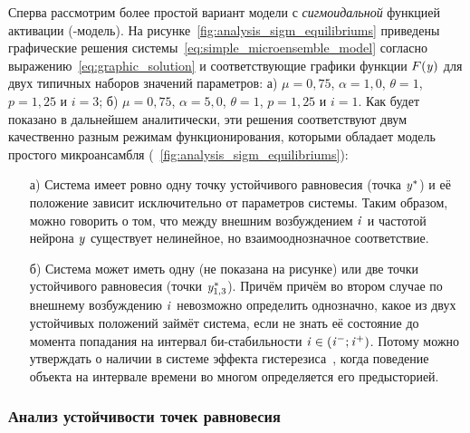 Сперва рассмотрим более простой вариант модели с \textit{сигмоидальной} функцией активации (-модель). На рисунке~\ref{fig:analysis_sigm_equilibriums} приведены графические решения системы~\eqref{eq:simple_microensemble_model} согласно выражению~\eqref{eq:graphic_solution} и соответствующие графики функции $F(\mathit{y})$ для двух типичных наборов значений параметров: а) $\mu = 0,75$, $\alpha = 1,0$, $\theta = 1$, $p = 1,25$ и $i = 3$; б) $\mu = 0,75$, $\alpha = 5,0$, $\theta = 1$, $p = 1,25$ и $i = 1$.
Как будет показано в дальнейшем аналитически, эти решения соответствуют двум качественно разным режимам функционирования, которыми обладает модель простого микроансамбля (\seefigure~\ref{fig:analysis_sigm_equilibriums}):
\begin{itemize}
    \item[а)] Система имеет ровно одну точку устойчивого равновесия (точка $\mathit{y}^{*}$) и её положение зависит исключительно от параметров системы. Таким образом, можно говорить о том, что между внешним возбуждением $\mathit{i}$ и частотой нейрона $\mathit{y}$ существует нелинейное, но взаимооднозначное соответствие.
    \item[б)] Система может иметь одну (не показана на рисунке) или две точки устойчивого равновесия (точки $\mathit{y}_{1,3}^{*}$). Причём причём во втором случае по внешнему возбуждению $\mathit{i}$ невозможно определить однозначно, какое из двух устойчивых положений займёт система, если не знать её состояние до момента попадания на интервал би-стабильности $\mathit{i} \in (\mathit{i}^{-}; \mathit{i}^{+})$. Потому можно утверждать о наличии в системе эффекта гистерезиса~\cite{Krasnoselsky1983}, когда поведение объекта на интервале времени во многом определяется его предысторией.
\end{itemize}

\subsubsection{Анализ устойчивости точек равновесия}

